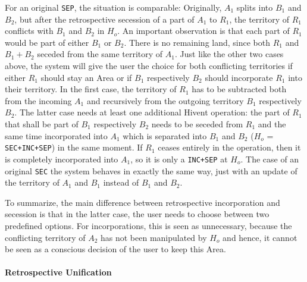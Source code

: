 For an original \texttt{SEP}, the situation is comparable: Originally, $A_1$ splits into $B_1$ and $B_2$, but after the retrospective secession of a part of $A_1$ to $R_1$, the territory of $R_1$ conflicts with $B_1$ and $B_2$ in $H_o$. An important observation is that each part of $R_1$ would be part of either $B_1$ or $B_2$. There is no remaining land, since both $R_1$ and $B_1+B_2$ seceded from the same territory of $A_1$. Just like the other two cases above, the system will give the user the choice for both conflicting territories if either $R_1$ should stay an Area or if $B_1$ respectively $B_2$ should incorporate $R_1$ into their territory. In the first case, the territory of $R_1$ has to be subtracted both from the incoming $A_1$ and recursively from the outgoing territory $B_1$ respectively $B_2$. The latter case needs at least one additional Hivent operation: the part of $R_1$ that shall be part of $B_1$ respectively $B_2$ needs to be seceded from $R_1$ and the same time incorporated into $A_1$ which is separated into $B_1$ and $B_2$ ($H_o$ = \texttt{SEC+INC+SEP}) in the same moment. If $R_1$ ceases entirely in the operation, then it is completely incorporated into $A_1$, so it is only a \texttt{INC+SEP} at $H_o$. The case of an original \texttt{SEC} the system behaves in exactly the same way, just with an update of the territory of $A_1$ and $B_1$ instead of $B_1$ and $B_2$.

To summarize, the main difference between retrospective incorporation and secession is that in the latter case, the user needs to choose between two predefined options. For incorporations, this is seen as unnecessary, because the conflicting territory of $A_2$ has not been manipulated by $H_o$ and hence, it cannot be seen as a conscious decision of the user to keep this Area.


\paragraph{Retrospective Unification} %
\label{par:retrospective_unification}

